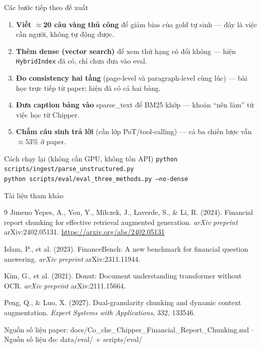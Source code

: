 \documentclass[aspectratio=169,11pt]{beamer}
\newcommand{\src}[1]{{\footnotesize\ttfamily #1}}
\begin{document}
\begin{frame}{Các bước tiếp theo đề xuất}
  \begin{enumerate}\small
    \item \textbf{Viết $\approx$20 câu vàng thủ công} để giảm bias của gold tự sinh —
      đây là việc cần người, không tự động được.
    \item \textbf{Thêm dense (vector search)} để xem thứ hạng có đổi không — hiện
      \texttt{HybridIndex} đã có, chỉ chưa đưa vào eval.
    \item \textbf{Đo consistency hai tầng} (page-level và paragraph-level cùng lúc)
      — bài học trực tiếp từ paper; hiện đã có cả hai bảng.
    \item \textbf{Đưa caption bảng vào} \src{sparse\_text} để BM25 khớp — khoản
      ``nên làm'' từ việc học từ Chipper.
    \item \textbf{Chấm câu sinh trả lời} (cần lớp PoT/tool-calling) — cả ba chiến
      lược vẫn $\approx$53\% ở paper.
  \end{enumerate}
  \vspace{0.4em}
  \begin{block}{\small Cách chạy lại (không cần GPU, không tốn API)}
    \small
    \texttt{python scripts/ingest/parse\_unstructured.py}\\
    \texttt{python scripts/eval/eval\_three\_methods.py --no-dense}
  \end{block}
\end{frame}

\begin{frame}[fragile]{Tài liệu tham khảo}
  \footnotesize
  \begin{thebibliography}{9}
    Jimeno Yepes, A., You, Y., Milczek, J., Laverde, S., \& Li, R. (2024).
    \newblock Financial report chunking for effective retrieval augmented generation.
    \newblock \emph{arXiv preprint} arXiv:2402.05131.
    \newblock \url{https://arxiv.org/abs/2402.05131}

    Islam, P., et al. (2023).
    \newblock FinanceBench: A new benchmark for financial question answering.
    \newblock \emph{arXiv preprint} arXiv:2311.11944.

    Kim, G., et al. (2021).
    \newblock Donut: Document understanding transformer without OCR.
    \newblock \emph{arXiv preprint} arXiv:2111.15664.

    Peng, Q., \& Luo, X. (2027).
    \newblock Dual-granularity chunking and dynamic context augmentation.
    \newblock \emph{Expert Systems with Applications}, 332, 133546.
  \end{thebibliography}
  \vspace{0.3em}
  {\footnotesize Nguồn số liệu paper: \src{docs/Co\_che\_Chipper\_Financial\_Report\_Chunking.md}
  $\cdot$ Nguồn số liệu đo: \src{data/eval/} + \src{scripts/eval/}}
\end{frame}
\end{document}
